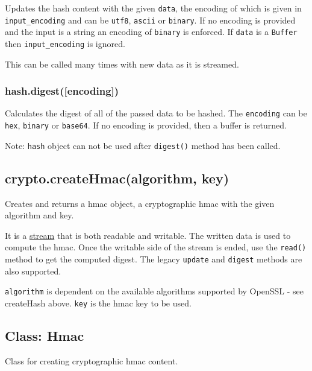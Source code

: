 Updates the hash content with the given \texttt{data}, the encoding of
which is given in \texttt{input\_encoding} and can be
\texttt{\textquotesingle{}utf8\textquotesingle{}},
\texttt{\textquotesingle{}ascii\textquotesingle{}} or
\texttt{\textquotesingle{}binary\textquotesingle{}}. If no encoding is
provided and the input is a string an encoding of
\texttt{\textquotesingle{}binary\textquotesingle{}} is enforced. If
\texttt{data} is a \texttt{Buffer} then \texttt{input\_encoding} is
ignored.

This can be called many times with new data as it is streamed.

\subsubsection{hash.digest({[}encoding{]})}\label{hash.digestencoding}

Calculates the digest of all of the passed data to be hashed. The
\texttt{encoding} can be
\texttt{\textquotesingle{}hex\textquotesingle{}},
\texttt{\textquotesingle{}binary\textquotesingle{}} or
\texttt{\textquotesingle{}base64\textquotesingle{}}. If no encoding is
provided, then a buffer is returned.

Note: \texttt{hash} object can not be used after \texttt{digest()}
method has been called.

\subsection{crypto.createHmac(algorithm,
key)}\label{crypto.createhmacalgorithm-key}

Creates and returns a hmac object, a cryptographic hmac with the given
algorithm and key.

It is a \href{stream.html}{stream} that is both readable and writable.
The written data is used to compute the hmac. Once the writable side of
the stream is ended, use the \texttt{read()} method to get the computed
digest. The legacy \texttt{update} and \texttt{digest} methods are also
supported.

\texttt{algorithm} is dependent on the available algorithms supported by
OpenSSL - see createHash above. \texttt{key} is the hmac key to be used.

\subsection{Class: Hmac}\label{class-hmac}

Class for creating cryptographic hmac content.

